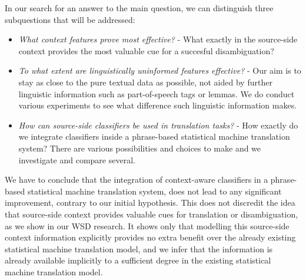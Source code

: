 In our search for an answer to the main question, we can distinguish three subquestions that will be addressed:

\begin{itemize}
\item \emph{What context features prove most effective?} - What exactly in the source-side context provides the most valuable cue for a succesful disambiguation?
\item \emph{To what extent are linguistically uninformed features effective?} -  Our aim is to stay as close to the pure textual data as possible, not aided by further linguistic information such as part-of-speech tags or lemmas. We do conduct various experiments to see what difference such linguistic information makes.
\item \emph{How can source-side classifiers be used in translation tasks?} - How exactly do we integrate classifiers inside a phrase-based statistical machine translation system? There are various possibilities and choices to make and we investigate and compare several.
\end{itemize}

We have to conclude that the integration of context-aware classifiers in a
phrase-based statistical machine translation system, does not lead to any
significant improvement, contrary to our initial hypothesis. This does not
discredit the idea that source-side context provides valuable cues for
translation or disambiguation, as we show in our WSD research.  It shows only
that modelling this source-side context information explicitly provides no
extra benefit over the already existing statistical machine translation model, and we infer
that the information is already available implicitly to a sufficient degree in the
existing statistical machine translation model.

